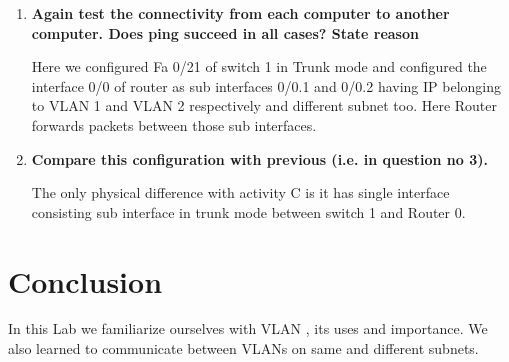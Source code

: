 \documentclass[a4paper,11pt]{article}
\begin{document}
\begin{enumerate}
    \item\textbf{ Again test the connectivity from each computer to another computer. Does ping succeed
              in all cases? State reason}












          Here we configured Fa 0/21 of switch 1 in Trunk mode and configured the interface 0/0 of router as sub interfaces 0/0.1 and 0/0.2  having IP belonging to VLAN 1 and VLAN 2 respectively and different subnet too. Here Router forwards packets between those sub interfaces.

    \item\textbf{ Compare this configuration with previous (i.e. in question no 3).}

          The only physical difference with activity C is it has single interface consisting sub interface in trunk mode between switch 1 and Router 0.


\end{enumerate}









\pagebreak

\section{Conclusion}

In this Lab we familiarize ourselves with VLAN , its uses and importance. We also learned to communicate between VLANs on same and different subnets.
\end{document}
